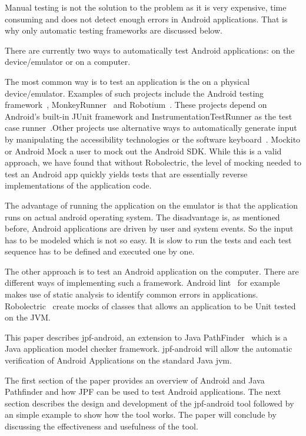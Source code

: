 \documentclass{acm_proc_article-sp}
\begin{document}
Manual testing is not the solution to the problem as it is very expensive, time consuming and does not detect enough errors in
Android applications. That is why only automatic testing frameworks are discussed below.

There are currently two ways to automatically test Android applications: on the device/emulator or on a computer.

The most common way is to test an application is the on a physical device/emulator. Examples of such projects include 
the Android testing framework~\cite{AndroidTesting}, MonkeyRunner~\cite{AndroidTesting} and Robotium~\cite{Robotium}. 
These projects depend on Android's built-in JUnit framework and InstrumentationTestRunner as the test case runner~\cite{AndroidTesting}.Other
projects use alternative ways to automatically generate input by manipulating the accessibility technologies 
or the software keyboard~\cite{AccessibilityTech, KeyboardModel}. Mockito or Android Mock a user to  mock out the Android SDK. While this is a valid approach, we have found that without Robolectric, the level of mocking needed to test an 
Android app quickly yields tests that are essentially reverse implementations of the application code.
 
The advantage of running the application on the emulator is that the application runs on actual android operating system. The disadvantage is, as mentioned before,
Android applications are driven by user and system events. So the input has to be modeled which is not so easy. It is slow to run the tests and each test 
sequence has to be defined and executed one by one. 
 
The other approach is to test an Android application on the computer. There are different ways of implementing such a framework. Android lint~\cite{} for example makes 
use of static analysis to identify common errors in applications. Robolectric~\cite{} create mocks of classes that allows an application to be Unit tested on the JVM.

This paper describes jpf-android, an extension to Java PathFinder~\cite{JPFDocs} which is a Java application model checker framework. jpf-android will allow the automatic
verification of Android Applications on the standard Java jvm. 

The first section of the paper provides an overview of Android and Java Pathfinder and how JPF can be used to test Android applications.
The next section describes the design and development of the jpf-android tool followed by an simple example to show how the tool works. The
paper will conclude by discussing the effectiveness and usefulness of the tool.
\end{document}
